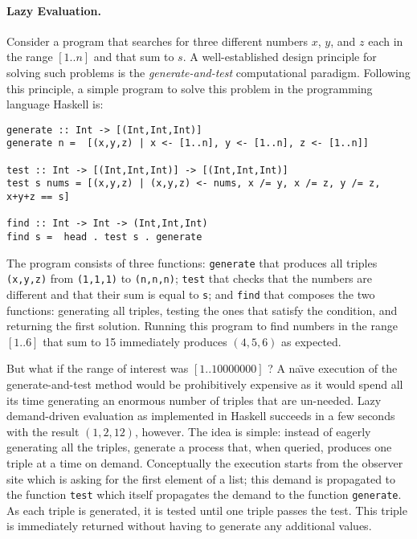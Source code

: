 \documentclass{article}
\begin{document}
\begin{refsection}
\paragraph*{Lazy Evaluation.}
Consider a program that searches for three different numbers $x$, $y$,
and $z$ each in the range $[1..n]$ and that sum to $s$. A
well-established design principle for solving such problems is the
\emph{generate-and-test} computational paradigm. Following this
principle, a simple program to solve this problem in the programming
language Haskell is:

\begin{verbatim}
generate :: Int -> [(Int,Int,Int)]
generate n =  [(x,y,z) | x <- [1..n], y <- [1..n], z <- [1..n]]

test :: Int -> [(Int,Int,Int)] -> [(Int,Int,Int)]
test s nums = [(x,y,z) | (x,y,z) <- nums, x /= y, x /= z, y /= z, x+y+z == s]

find :: Int -> Int -> (Int,Int,Int)
find s =  head . test s . generate
\end{verbatim}

The program consists of three functions: \verb|generate| that produces
all triples \verb|(x,y,z)| from \verb|(1,1,1)| to \verb|(n,n,n)|;
\verb|test| that checks that the numbers are different and that their
sum is equal to \verb|s|; and \verb|find| that composes the two
functions: generating all triples, testing the ones that satisfy the
condition, and returning the first solution. Running this program to
find numbers in the range $[1..6]$ that sum to 15 immediately produces
$(4,5,6)$ as expected.

But what if the range of interest was $[1..10000000]$ ? A na\"\i ve
execution of the generate-and-test method would be prohibitively
expensive as it would spend all its time generating an enormous number
of triples that are un-needed. Lazy demand-driven evaluation as
implemented in Haskell succeeds in a few seconds with the result
$(1,2,12)$, however. The idea is simple: instead of eagerly generating
all the triples, generate a process that, when queried, produces one
triple at a time on demand. Conceptually the execution starts from the
observer site which is asking for the first element of a list; this
demand is propagated to the function \verb|test| which itself
propagates the demand to the function \verb|generate|. As each triple
is generated, it is tested until one triple passes the test. This
triple is immediately returned without having to generate any
additional values.


\end{refsection}
\end{document}
